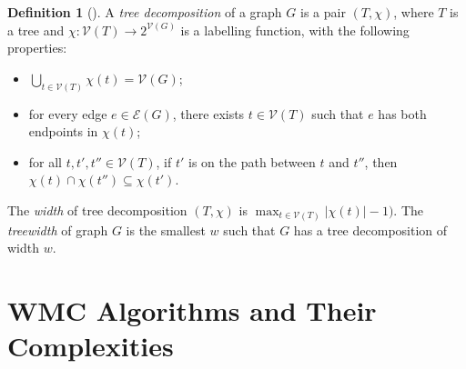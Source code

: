 \documentclass{article}
\theoremstyle{definition}
\newtheorem{definition}{Definition}
\theoremstyle{remark}
\begin{document}
\begin{definition}[\cite{DBLP:journals/jct/RobertsonS84}]
  A \emph{tree decomposition} of a graph $G$ is a pair $(T, \chi)$, where $T$ is
  a tree and $\chi\colon \mathcal{V}(T) \to 2^{\mathcal{V}(G)}$ is a labelling
  function, with the following properties:
  \begin{itemize}
  \item $\bigcup_{t \in \mathcal{V}(T)} \chi(t) = \mathcal{V}(G)$;
  \item for every edge $e \in \mathcal{E}(G)$, there exists $t \in
    \mathcal{V}(T)$ such that $e$ has both endpoints in $\chi(t)$;
  \item for all $t, t', t'' \in \mathcal{V}(T)$, if $t'$ is on the path between
    $t$ and $t''$, then $\chi(t) \cap \chi(t'') \subseteq \chi(t')$.
  \end{itemize}
  The \emph{width} of tree decomposition $(T, \chi)$ is $\max_{t \in
    \mathcal{V}(T)} |\chi(t)| - 1)$. The \emph{treewidth} of graph $G$ is the
  smallest $w$ such that $G$ has a tree decomposition of width $w$.
\end{definition}

\section{\textsf{\textmd{WMC}} Algorithms and Their Complexities}

\end{document}
